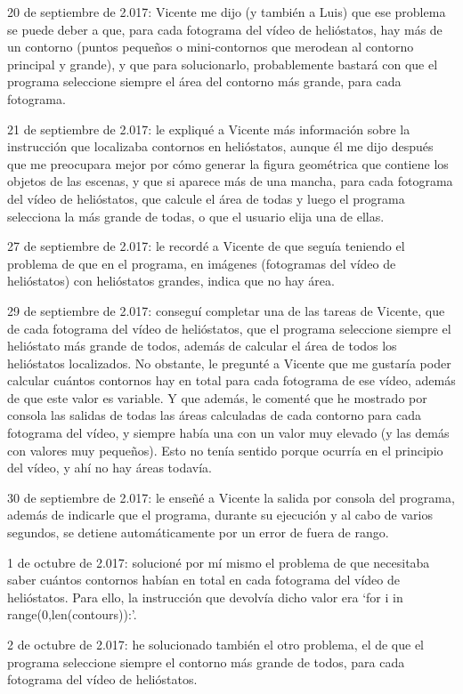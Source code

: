 20 de septiembre de 2.017: Vicente me dijo (y también a Luis) que ese problema se puede deber a que, para cada fotograma del vídeo de helióstatos, hay más de un contorno (puntos pequeños o mini-contornos que merodean al contorno principal y grande), y que para solucionarlo, probablemente bastará con que el programa seleccione siempre el área del contorno más grande, para cada fotograma.

21 de septiembre de 2.017: le expliqué a Vicente más información sobre la instrucción que localizaba contornos en helióstatos, aunque él me dijo después que me preocupara mejor por cómo generar la figura geométrica que contiene los objetos de las escenas, y que si aparece más de una mancha, para cada fotograma del vídeo de helióstatos, que calcule el área de todas y luego el programa selecciona la más grande de todas, o que el usuario elija una de ellas.

27 de septiembre de 2.017: le recordé a Vicente de que seguía teniendo el problema de que en el programa, en imágenes (fotogramas del vídeo de helióstatos) con helióstatos grandes, indica que no hay área.

29 de septiembre de 2.017: conseguí completar una de las tareas de Vicente, que de cada fotograma del vídeo de helióstatos, que el programa seleccione siempre el helióstato más grande de todos, además de calcular el área de todos los helióstatos localizados. No obstante, le pregunté a Vicente que me gustaría poder calcular cuántos contornos hay en total para cada fotograma de ese vídeo, además de que este valor es variable. Y que además, le comenté que he mostrado por consola las salidas de todas las áreas calculadas de cada contorno para cada fotograma del vídeo, y siempre había una con un valor muy elevado (y las demás con valores muy pequeños). Esto no tenía sentido porque ocurría en el principio del vídeo, y ahí no hay áreas todavía.

30 de septiembre de 2.017: le enseñé a Vicente la salida por consola del programa, además de indicarle que el programa, durante su ejecución y al cabo de varios segundos, se detiene automáticamente por un error de fuera de rango.

1 de octubre de 2.017: solucioné por mí mismo el problema de que necesitaba saber cuántos contornos habían en total en cada fotograma del vídeo de helióstatos. Para ello, la instrucción que devolvía dicho valor era ‘for i in range(0,len(contours)):’.

2 de octubre de 2.017: he solucionado también el otro problema, el de que el programa seleccione siempre el contorno más grande de todos, para cada fotograma del vídeo de helióstatos.

